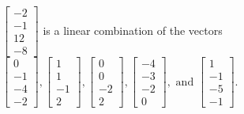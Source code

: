 \begin{exercise}
\begin{exerciseStatement}
  \end{exerciseStatement}
  \begin{exerciseAnswer}
   \(\left[\begin{array}{c}
-2 \\
-1 \\
12 \\
-8
\end{array}\right]\) 
  	 is  
	a linear combination of the vectors \(\left[\begin{array}{c}
0 \\
-1 \\
-4 \\
-2
\end{array}\right] , \left[\begin{array}{c}
1 \\
1 \\
-1 \\
2
\end{array}\right] , \left[\begin{array}{c}
0 \\
0 \\
-2 \\
2
\end{array}\right] , \left[\begin{array}{c}
-4 \\
-3 \\
-2 \\
0
\end{array}\right] , \text{ and } \left[\begin{array}{c}
1 \\
-1 \\
-5 \\
-1
\end{array}\right]\).

	
  


  \end{exerciseAnswer}
\end{exercise}